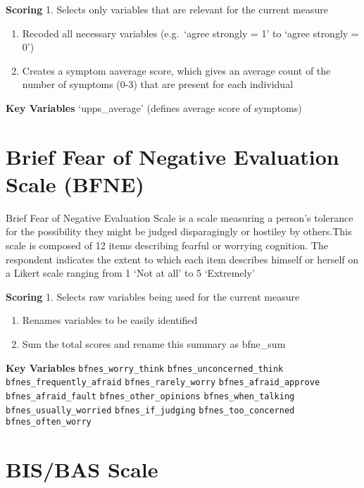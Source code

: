 \documentclass[
]{book}
\begin{document}
\textbf{Scoring}
1. Selects only variables that are relevant for the current measure

\begin{enumerate}
\def\labelenumi{\arabic{enumi}.}
\setcounter{enumi}{1}
\item
  Recoded all necessary variables (e.g.~`agree strongly = 1' to `agree strongly = 0')
\item
  Creates a symptom aaverage score, which gives an average count of the number of symptoms (0-3) that are present for each individual
\end{enumerate}

\textbf{Key Variables}
`upps\_average' (defines average score of symptoms)

\hypertarget{brief-fear-of-negative-evaluation-scale-bfne}{%
\section{Brief Fear of Negative Evaluation Scale (BFNE)}\label{brief-fear-of-negative-evaluation-scale-bfne}}

Brief Fear of Negative Evaluation Scale is a scale measuring a person's tolerance for the possibility they might be judged disparagingly or hostiley by others.This scale is composed of 12 items describing fearful or worrying cognition. The respondent indicates the extent to which each item describes himself or herself on a Likert scale ranging from 1 `Not at all' to 5 `Extremely'

\textbf{Scoring}
1. Selects raw variables being used for the current measure

\begin{enumerate}
\def\labelenumi{\arabic{enumi}.}
\setcounter{enumi}{1}
\item
  Renames variables to be easily identified
\item
  Sum the total scores and rename this summary as bfne\_sum
\end{enumerate}

\textbf{Key Variables}
\texttt{bfnes\_worry\_think}
\texttt{bfnes\_unconcerned\_think}
\texttt{bfnes\_frequently\_afraid}
\texttt{bfnes\_rarely\_worry}
\texttt{bfnes\_afraid\_approve}
\texttt{bfnes\_afraid\_fault}
\texttt{bfnes\_other\_opinions}
\texttt{bfnes\_when\_talking}
\texttt{bfnes\_usually\_worried}
\texttt{bfnes\_if\_judging}
\texttt{bfnes\_too\_concerned}
\texttt{bfnes\_often\_worry}

\hypertarget{bisbas-scale}{%
\section{BIS/BAS Scale}\label{bisbas-scale}}
\end{document}
